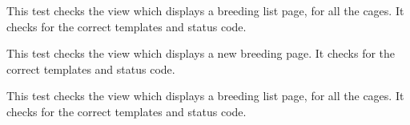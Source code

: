 \documentclass[letterpaper,10pt,english]{sphinxmanual}
\begin{document}
\begin{fulllineitems}
\begin{fulllineitems}
\end{fulllineitems}


\begin{fulllineitems}
\label{animals:mousedb.animal.tests.BreedingViewTests.test_breeding_list_all}
This test checks the view which displays a breeding list page, for all the cages.  It checks for the correct templates and status code.

\end{fulllineitems}


\begin{fulllineitems}
\label{animals:mousedb.animal.tests.BreedingViewTests.test_breeding_new}
This test checks the view which displays a new breeding page.  It checks for the correct templates and status code.

\end{fulllineitems}


\begin{fulllineitems}
\label{animals:mousedb.animal.tests.BreedingViewTests.test_timed_mating_list}
This test checks the view which displays a breeding list page, for all the cages.  It checks for the correct templates and status code.

\end{fulllineitems}


\end{fulllineitems}

\end{document}
